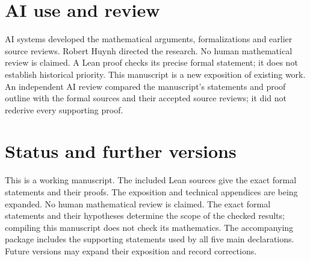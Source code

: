 \documentclass[11pt]{article}
\begin{document}
\section{AI use and review}
AI systems developed the mathematical arguments, formalizations and earlier source reviews. Robert Huynh directed the research. No human mathematical review is claimed. A Lean proof checks its precise formal statement; it does not establish historical priority. This manuscript is a new exposition of existing work. An independent AI review compared the manuscript's statements and proof outline with the formal sources and their accepted source reviews; it did not rederive every supporting proof.
\section{Status and further versions}
This is a working manuscript. The included Lean sources give the exact formal statements and their proofs. The exposition and technical appendices are being expanded. No human mathematical review is claimed. The exact formal statements and their hypotheses determine the scope of the checked results; compiling this manuscript does not check its mathematics.
The accompanying package includes the supporting statements used by all five main declarations. Future versions may expand their exposition and record corrections.
\end{document}
